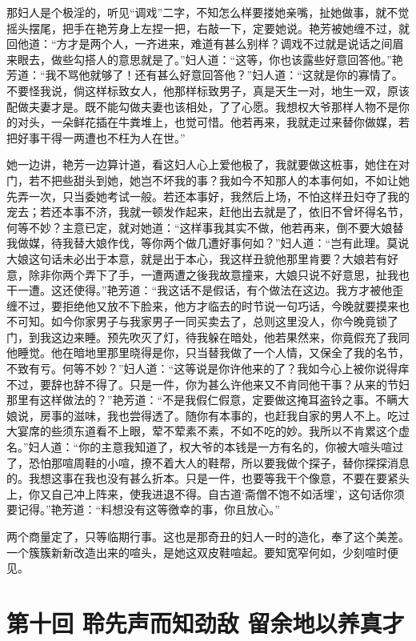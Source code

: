 \documentclass[a4paper,12pt,UTF8,twoside]{ctexbook}
\begin{document}
那妇人是个极淫的，听见“调戏”二字，不知怎么样要搂她亲嘴，扯她做事，就不觉摇头摆尾，把手在艳芳身上左捏一把，右敲一下，定要她说。艳芳被她缠不过，就回他道：“方才是两个人，一齐进来，难道有甚么别样？调戏不过就是说话之间眉来眼去，做些勾搭人的意思就是了。”妇人道：“这等，你也该露些好意回答他。”艳芳道：“我不骂他就够了！还有甚么好意回答他？”妇人道：“这就是你的寡情了。不要怪我说，倘这样标致女人，他那样标致男子，真是天生一对，地生一双，原该配做夫妻才是。既不能勾做夫妻也该相处，了了心愿。我想权大爷那样人物不是你的对头，一朵鲜花插在牛粪堆上，也觉可惜。他若再来，我就走过来替你做媒，若把好事干得一两遭也不枉为人在世。”

她一边讲，艳芳一边算计道，看这妇人心上爱他极了，我就要做这桩事，她住在对门，若不把些甜头到她，她岂不坏我的事？我如今不知那人的本事何如，不如让她先弄一次，只当委她考试一般。若还本事好，我然后上场，不怕这样丑妇夺了我的宠去；若还本事不济，我就一顿发作起来，赶他出去就是了，依旧不曾坏得名节，何等不妙？主意已定，就对她道：“这样事我其实不做，他若再来，倒不要大娘替我做媒，待我替大娘作伐，等你两个做几遭好事何如？”妇人道：“岂有此理。莫说大娘这句话未必出于本意，就是出于本心，我这样丑貌他那里肯要？大娘若有好意，除非你两个弄下了手，一遭两遭之後我故意撞来，大娘只说不好意思，扯我也干一遭。这还使得。”艳芳道：“我这话不是假话，有个做法在这边。我方才被他歪缠不过，要拒绝他又放不下脸来，他方才临去的时节说一句巧话，今晚就要摸来也不可知。如今你家男子与我家男子一同买卖去了，总则这里没人，你今晚竟锁了门，到我这边来睡。预先吹灭了灯，待我躲在暗处，他若果然来，你竟假充了我同他睡觉。他在暗地里那里晓得是你，只当替我做了一个人情，又保全了我的名节，不致有亏。何等不妙？”妇人道：“这等说是你许他来的了？我如今心上被你说得痒不过，要辞也辞不得了。只是一件，你为甚么许他来又不肯同他干事？从来的节妇那里有这样做法的？”艳芳道：“不是我假仁假意，定要做这掩耳盗铃之事。不瞒大娘说，房事的滋味，我也尝得透了。随你有本事的，也赶我自家的男人不上。吃过大宴席的些须东道看不上眼，荤不荤素不素，不如不吃的妙。我所以不肯累这个虚名。”妇人道：“你的主意我知道了，权大爷的本钱是一方有名的，你被大喧头喧过了，恐怕那喧周鞋的小喧，撩不着大人的鞋帮，所以要我做个探子，替你探探消息的。我想这事在我也没有甚么折本。只是一件，也要等我干个像意，不要在要紧头上，你又自己冲上阵来，使我进退不得。自古道‘斋僧不饱不如活埋’，这句话你须要记得。”艳芳道：“料想没有这等徼幸的事，你且放心。”

两个商量定了，只等临期行事。这也是那奇丑的妇人一时的造化，奉了这个美差。一个簇簇新新改造出来的喧头，是她这双皮鞋喧起。要知宽窄何如，少刻喧时便见。

\chapter{第十回 聆先声而知劲敌 留余地以养真才}
\end{document}
